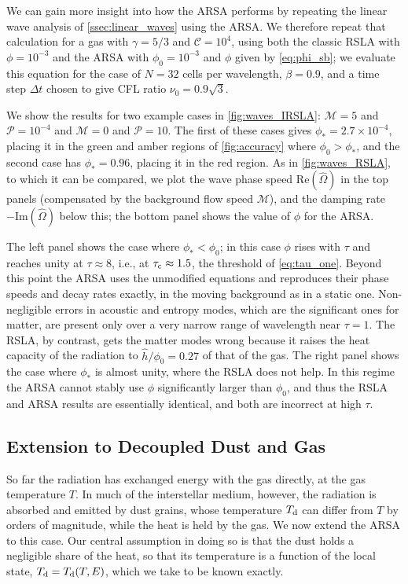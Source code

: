 \documentclass[preprint,12pt,authoryear]{elsarticle}
\newcommand{\hOmega}{\hat{\Omega}}
\newcommand{\calP}{\mathcal{P}}
\newcommand{\calM}{\mathcal{M}}
\begin{document}
We can gain more insight into how the ARSA performs by repeating the linear wave analysis of \autoref{ssec:linear_waves} using the ARSA. We therefore repeat that calculation for a gas with $\gamma = 5/3$ and $\mathcal{C} = 10^4$, using both the classic RSLA with $\phi = 10^{-3}$ and the ARSA with $\phi_0 = 10^{-3}$ and $\phi$ given by \autoref{eq:phi_sb}; we evaluate this equation for the case of $N = 32$ cells per wavelength, $\beta = 0.9$, and a time step $\Delta t$ chosen to give CFL ratio $\nu_0 = 0.9\sqrt{3}$.

We show the results for two example cases in \autoref{fig:waves_IRSLA}: $\calM = 5$ and $\calP = 10^{-4}$ and $\calM = 0$ and $\calP = 10$. The first of these cases gives $\phi_* = 2.7\times10^{-4}$, placing it in the green and amber regions of \autoref{fig:accuracy} where $\phi_0 > \phi_*$, and the second case has $\phi_* = 0.96$, placing it in the red region. As in \autoref{fig:waves_RSLA}, to which it can be compared, we plot the wave phase speed $\mathrm{Re}(\hOmega)$ in the top panels (compensated by the background flow speed $\calM$), and the damping rate $-\mathrm{Im}(\hOmega)$ below this; the bottom panel shows the value of $\phi$ for the ARSA.

The left panel shows the case where $\phi_* < \phi_0$; in this case $\phi$ rises with $\tau$ and reaches unity at $\tau \approx 8$, i.e., at $\tau_{\rm c} \approx 1.5$, the threshold of \autoref{eq:tau_one}. Beyond this point the ARSA uses the unmodified equations and reproduces their phase speeds and decay rates exactly, in the moving background as in a static one. Non-negligible errors in acoustic and entropy modes, which are the significant ones for matter, are present only over a very narrow range of wavelength near $\tau = 1$. The RSLA, by contrast, gets the matter modes wrong because it raises the heat capacity of the radiation to $\hat{h}/\phi_0 = 0.27$ of that of the gas. The right panel shows the case where $\phi_*$ is almost unity, where the RSLA does not help. In this regime the ARSA cannot stably use $\phi$ significantly larger than $\phi_0$, and thus the RSLA and ARSA results are essentially identical, and both are incorrect at high $\tau$.

\subsection{Extension to Decoupled Dust and Gas}

So far the radiation has exchanged energy with the gas directly, at the gas temperature $T$. In much of the interstellar medium, however, the radiation is absorbed and emitted by dust grains, whose temperature $T_{\rm d}$ can differ from $T$ by orders of magnitude, while the heat is held by the gas. We now extend the ARSA to this case. Our central assumption in doing so is that the dust holds a negligible share of the heat, so that its temperature is a function of the local state, $T_{\rm d} = T_{\rm d}(T, E)$, which we take to be known exactly.
\end{document}

